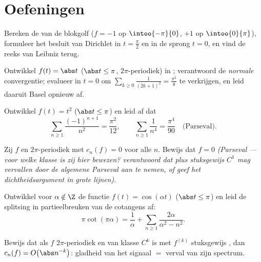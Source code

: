 \section{Oefeningen}

\begin{exercise}[$\star$]\label{exo:b2:fourier:1}
Bereken de  van de blokgolf ($f = -1$ op
$\intoo{-\pi}{0}$, $+1$ op $\intoo{0}{\pi}$), formuleer het besluit
van Dirichlet in $t = \frac\pi2$ en in de sprong $t = 0$, en vind
de reeks van Leibniz terug.
\end{exercise}

\begin{exercise}[$\star$]\label{exo:b2:fourier:2}
Ontwikkel $f(t) = \abs t$ ($\abs t \leq \pi$, $2\pi$-periodiek) in
; verantwoord de \emph{normale} convergentie; evalueer
in $t = 0$ om $\sum_{k\geq0}\frac{1}{(2k+1)^2} = \frac{\pi^2}{8}$
te verkrijgen, en leid daaruit Basel opnieuw af.
\end{exercise}

\begin{exercise}[$\star$]\label{exo:b2:fourier:3}
Ontwikkel $f(t) = t^2$ ($\abs t \leq \pi$) en leid af dat
\[
\sum_{n\geq1}\frac{(-1)^{n+1}}{n^2} = \frac{\pi^2}{12},
\qquad
\sum_{n\geq1}\frac{1}{n^4} = \frac{\pi^4}{90}
\quad\text{(Parseval)}.
\]
\end{exercise}

\begin{exercise}[$\star\star$]\label{exo:b2:fourier:4}
Zij $f$  en $2\pi$-periodiek met $c_n(f) = 0$ voor alle $n$.
Bewijs dat $f = 0$ \emph{(Parseval --- voor welke klasse is zij
hier bewezen? verantwoord dat  plus stuksgewijs $C^1$
mag vervallen door de algemene Parseval aan te nemen, of geef het
dichtheidsargument in grote lijnen)}.
\end{exercise}

\begin{exercise}[$\star\star$]\label{exo:b2:fourier:5}
Ontwikkel voor $\alpha \notin \Z$ de functie $f(t) = \cos(\alpha
t)$ ($\abs t \leq \pi$) en leid de splitsing in partieelbreuken van
de cotangens af:
\[
\pi\cot(\pi\alpha) = \frac{1}{\alpha} + \sum_{n\geq1}
\frac{2\alpha}{\alpha^2 - n^2} .
\]
\end{exercise}

\begin{exercise}[$\star\star$]\label{exo:b2:fourier:6}
Bewijs dat als $f$ $2\pi$-periodiek en van klasse $C^k$ is met
$f^{(k)}$ stuksgewijs , dan $c_n(f) = O\bigl(\abs
n^{-k}\bigr)$: gladheid van het signaal $=$ verval van zijn
spectrum.
\end{exercise}

